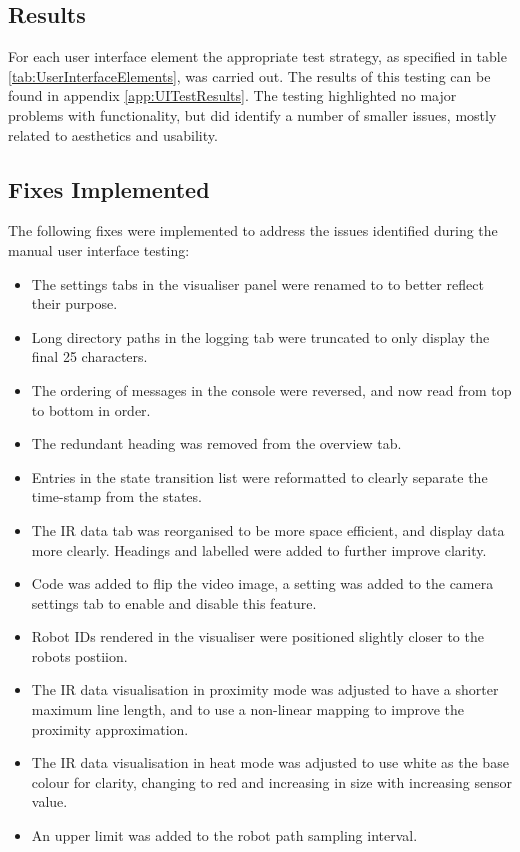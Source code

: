 \subsection{Results}
For each user interface element the appropriate test strategy, as specified in table \ref{tab:UserInterfaceElements}, was carried out. The results of this testing can be found in appendix \ref{app:UITestResults}. The testing highlighted no major problems with functionality, but did identify a number of smaller issues, mostly related to aesthetics and usability.

\subsection{Fixes Implemented}
The following fixes were implemented to address the issues identified during the manual user interface testing:

\begin{itemize}
 \item The settings tabs in the visualiser panel were renamed to to better reflect their purpose.
 \item Long directory paths in the logging tab were truncated to only display the final 25 characters.
 \item The ordering of messages in the console were reversed, and now read from top to bottom in order.
 \item The redundant heading was removed from the overview tab.
 \item Entries in the state transition list were reformatted to clearly separate the time-stamp from the states.
 \item The IR data tab was reorganised to be more space efficient, and display data more clearly. Headings and labelled were added to further improve clarity.
 \item Code was added to flip the video image, a setting was added to the camera settings tab to enable and disable this feature.
 \item Robot IDs rendered in the visualiser were positioned slightly closer to the robots postiion.
 \item The IR data visualisation in proximity mode was adjusted to have a shorter maximum line length, and to use a non-linear mapping to improve the proximity approximation.
 \item The IR data visualisation in heat mode was adjusted to use white as the base colour for clarity, changing to red and increasing in size with increasing sensor value.
 \item An upper limit was added to the robot path sampling interval.
\end{itemize}

